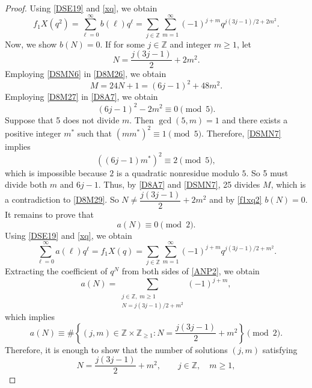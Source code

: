 \documentclass[12pt]{article}
\numberwithin{equation}{section}
\theoremstyle{definition}
\theoremstyle{remark}
\numberwithin{equation}{section}
\begin{document}
\begin{proof}
Using \eqref{DSE19} and \eqref{xq}, we obtain
\begin{equation}\label{f1xq2}
f_1X(q^2)=\sum_{\ell=0}^{\infty}b(\ell)q^\ell=\sum_{j\in\mathbb Z}\sum_{m=1}^{\infty} 
(-1)^{j+m}
q^{j(3j-1)/2+2m^2}.
\end{equation}
Now, we show 
$
b(N)=0.
$
If for some $j\in\mathbb Z$ and integer $m\geq1$, let 
\begin{equation}\label{DSMN6}
N=\dfrac{j(3j-1)}{2}+2m^2.
\end{equation}
Employing \eqref{DSMN6} in \eqref{D8M26}, we obtain
\begin{equation}\label{D8A7}
M=24N+1=(6j-1)^2+48m^2.
\end{equation}
Employing \eqref{D8M27} in \eqref{D8A7}, we obtain
\begin{equation}\label{DSMN7}
(6j-1)^2-2m^2\equiv0\pmod{5}.
\end{equation}
Suppose that 5 does not divide $m$. Then $\gcd(5, m)=1$ and there exists a positive integer $m^\ast$ such that $(mm^\ast)^2\equiv 1\pmod 5$.  Therefore, \eqref{DSMN7} implies 
$$\left((6j-1)m^\ast\right)^2\equiv2\pmod{5},$$
which is impossible because $2$ is a quadratic nonresidue modulo $5$.
So 5 must divide both $m$ and 
$6j-1$.  Thus, by  \eqref{D8A7} and \eqref{DSMN7}, 25 divides $M$,  which is a contradiction to 
 \eqref{D8M29}. So $N\neq\dfrac{j(3j-1)}{2}+2m^2$ and  by \eqref{f1xq2} $b(N)=0$.\\
It remains to prove  that
\begin{equation*}
a(N)\equiv 0 \pmod{2}.
\end{equation*}
Using \eqref{DSE19} and \eqref{xq}, we obtain
\begin{equation}
\sum_{\ell=0}^{\infty}a(\ell)q^\ell
=f_1X(q)=
\sum_{j\in\mathbb Z}
\sum_{m=1}^{\infty}
(-1)^{j+m}
q^{j(3j-1)/2+m^2}.
\label{ANP2}
\end{equation}
Extracting the coefficient of $q^N$ from both sides of
\eqref{ANP2}, we obtain
\begin{equation*}
a(N)=
\sum_{\substack{j\in\mathbb Z,\;m\geq 1\\
N=j(3j-1)/2+m^2}}
(-1)^{j+m}, 
\end{equation*}
which implies
$$a(N)\equiv
\#\left\{
(j,m)\in\mathbb Z\times\mathbb Z_{\geq1}:
N=\dfrac{j(3j-1)}{2}+m^2
\right\}
\pmod{2}.$$
Therefore, it is enough to show that the number of solutions $(j, m)$ satisfying 
\begin{equation}\label{ANP6}
N=\dfrac{j(3j-1)}{2}+m^2,
\qquad
j\in\mathbb Z,\quad m\geq1,
\end{equation}

\end{proof}
\end{document}
